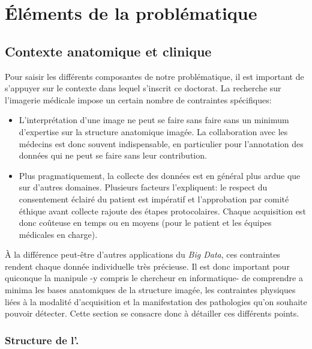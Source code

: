 \section{Éléments de la problématique}  %
\subsection{Contexte anatomique et clinique}

Pour saisir les différents composantes de notre problématique, il est important de s'appuyer sur le contexte dans lequel s'inscrit ce doctorat. La recherche sur l'imagerie médicale impose un certain nombre de contraintes spécifiques: 
\begin{itemize}
	\item L'interprétation d'une image ne peut se faire sans faire sans un minimum d'expertise sur la structure anatomique imagée. La collaboration avec les médecins est donc souvent indispensable, en particulier pour l'annotation des données qui ne peut se faire sans leur contribution. 
	\item Plus pragmatiquement, la collecte des données est en général plus ardue que sur d'autres domaines. Plusieurs facteurs l'expliquent: le respect du consentement éclairé du patient est impératif et l'approbation par comité éthique avant collecte rajoute des étapes protocolaires. Chaque acquisition est donc coûteuse en temps ou en moyens (pour le patient et les équipes médicales en charge).
\end{itemize}
À la différence peut-être d'autres applications du \textit{Big Data}, ces contraintes rendent chaque donnée individuelle très précieuse. Il est donc important pour quiconque la manipule -y compris le chercheur en informatique- de comprendre a minima les bases anatomiques de la structure imagée, les contraintes physiques liées à la modalité d'acquisition et la manifestation des pathologies qu'on souhaite pouvoir détecter. Cette section se consacre donc à détailler ces différents points.

\subsubsection{Structure de l'\oeil.}

